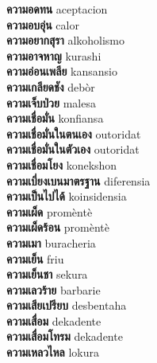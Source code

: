 \textbf{ ความอดทน  } aceptacion \\
\textbf{ ความอบอุ่น  } calor \\
\textbf{ ความอยากสุรา  } alkoholismo \\
\textbf{ ความอาจหาญ  } kurashi \\
\textbf{ ความอ่อนเพลีย  } kansansio \\
\textbf{ ความเกลียดชัง  } debòr \\
\textbf{ ความเจ็บป่วย  } malesa \\
\textbf{ ความเชื่อมั่น  } konfiansa \\
\textbf{ ความเชื่อมั่นในตนเอง  } outoridat \\
\textbf{ ความเชื่อมั่นในตัวเอง  } outoridat \\
\textbf{ ความเชื่อมโยง  } konekshon \\
\textbf{ ความเบี่ยงเบนมาตรฐาน  } diferensia \\
\textbf{ ความเป็นไปได้  } koinsidensia \\
\textbf{ ความเผ็ด  } promèntè \\
\textbf{ ความเผ็ดร้อน  } promèntè \\
\textbf{ ความเมา  } buracheria \\
\textbf{ ความเย็น  } friu \\
\textbf{ ความเย็นชา  } sekura \\
\textbf{ ความเลวร้าย  } barbarie \\
\textbf{ ความเสียเปรียบ  } desbentaha \\
\textbf{ ความเสื่อม  } dekadente \\
\textbf{ ความเสื่อมโทรม  } dekadente \\
\textbf{ ความเหลวไหล  } lokura \\
